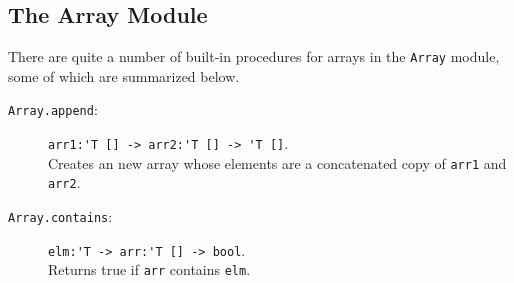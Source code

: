 \documentclass[fsharpNotes.tex]{subfiles}
\begin{document}
\subsection{The Array Module}
There are quite a number of built-in procedures for arrays in the \lstinline{Array} module, some of which are summarized below.
\begin{description}
\item[\texttt{Array.append}:] \lstinline{arr1:'T [] -> arr2:'T [] -> 'T []}.~\\
  Creates an new array whose elements are a concatenated copy of \lstinline{arr1} and \lstinline{arr2}.
\item[\texttt{Array.contains}:] \lstinline{elm:'T -> arr:'T [] -> bool}.~\\
  Returns true if \lstinline{arr} contains \lstinline{elm}.

\end{description}
\end{document}
